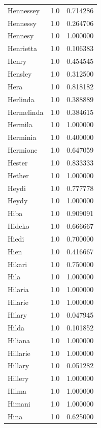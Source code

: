 \documentclass[
  letterpaper,
  DIV=11,
  numbers=noendperiod]{scrreprt}
\begin{document}
\begin{tabular}{lrr}
Hennessey       &   1.0 &   0.714286 \\
Hennessy        &   1.0 &   0.264706 \\
Hennesy         &   1.0 &   1.000000 \\
Henrietta       &   1.0 &   0.106383 \\
Henry           &   1.0 &   0.454545 \\
Hensley         &   1.0 &   0.312500 \\
Hera            &   1.0 &   0.818182 \\
Herlinda        &   1.0 &   0.388889 \\
Hermelinda      &   1.0 &   0.384615 \\
Hermila         &   1.0 &   1.000000 \\
Herminia        &   1.0 &   0.400000 \\
Hermione        &   1.0 &   0.647059 \\
Hester          &   1.0 &   0.833333 \\
Hether          &   1.0 &   1.000000 \\
Heydi           &   1.0 &   0.777778 \\
Heydy           &   1.0 &   1.000000 \\
Hiba            &   1.0 &   0.909091 \\
Hideko          &   1.0 &   0.666667 \\
Hiedi           &   1.0 &   0.700000 \\
Hien            &   1.0 &   0.416667 \\
Hikari          &   1.0 &   0.750000 \\
Hila            &   1.0 &   1.000000 \\
Hilaria         &   1.0 &   1.000000 \\
Hilarie         &   1.0 &   1.000000 \\
Hilary          &   1.0 &   0.047945 \\
Hilda           &   1.0 &   0.101852 \\
Hiliana         &   1.0 &   1.000000 \\
Hillarie        &   1.0 &   1.000000 \\
Hillary         &   1.0 &   0.051282 \\
Hillery         &   1.0 &   1.000000 \\
Hilma           &   1.0 &   1.000000 \\
Himani          &   1.0 &   1.000000 \\
Hina            &   1.0 &   0.625000 \\

\end{tabular}
\end{document}
